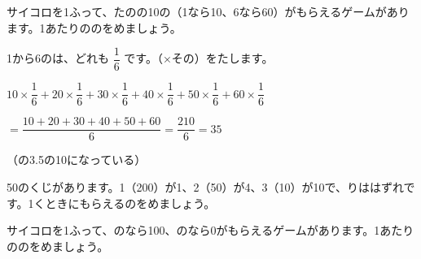 \begin{reidai}
サイコロを1ふって、たのの10の（1なら10、6なら60）がもらえるゲームがあります。1あたりののをめましょう。\par
\kangaekata 1から6のは、どれも $\dfrac{1}{6}$ です。（×その）をたします。\par
\shiki $10\times\dfrac{1}{6}+20\times\dfrac{1}{6}+30\times\dfrac{1}{6}+40\times\dfrac{1}{6}+50\times\dfrac{1}{6}+60\times\dfrac{1}{6}$\par
\hspace*{2.6\zw}$=\dfrac{10+20+30+40+50+60}{6}=\dfrac{210}{6}=35$\par
{}（の3.5の10になっている）
\end{reidai}

\begingroup{}%
\noindent\begin{minipage}[t]{0.49\linewidth}
\begin{jibun}
50のくじがあります。1（200）が1、2（50）が4、3（10）が10で、りははずれです。1くときにもらえるのをめましょう。
\end{jibun}
\end{minipage}\hfill
\begin{minipage}[t]{0.49\linewidth}
\begin{jibun}
サイコロを1ふって、のなら100、のなら0がもらえるゲームがあります。1あたりののをめましょう。
\end{jibun}
\end{minipage}\par
\endgroup

